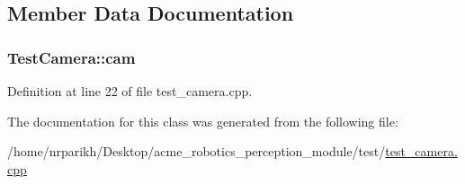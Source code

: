 \subsection{Member Data Documentation}
\subsubsection[{\texorpdfstring{cam}{cam}}]{ Test\+Camera\+::cam\hspace{0.3cm}{\ttfamily [protected]}}\hypertarget{class_test_camera_ac1abc17c2f7f776456583bc3a60db3a9}{}\label{class_test_camera_ac1abc17c2f7f776456583bc3a60db3a9}


Definition at line 22 of file test\+\_\+camera.\+cpp.



The documentation for this class was generated from the following file\+:\begin{DoxyCompactItemize}
\item 
/home/nrparikh/\+Desktop/acme\+\_\+robotics\+\_\+perception\+\_\+module/test/\hyperlink{test__camera_8cpp}{test\+\_\+camera.\+cpp}\end{DoxyCompactItemize}
